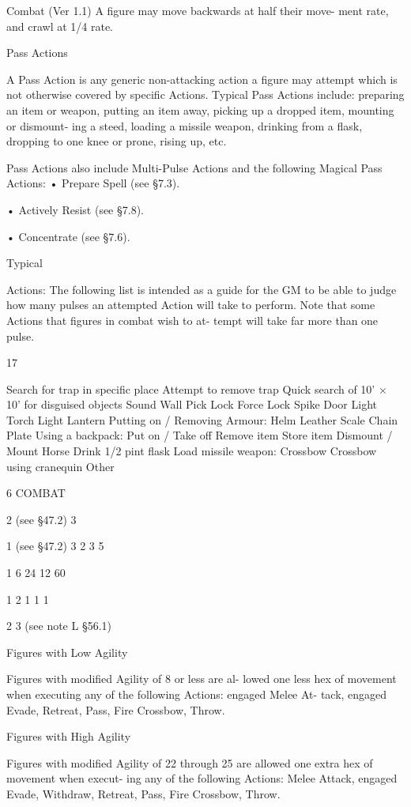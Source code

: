 \begin{Chapter}{Combat (Ver 1.1)}
A  figure may move backwards at half their move-
ment rate, and crawl at 1/4 rate. 

Pass Actions 

A Pass Action is any generic non-attacking action a 
figure may attempt which is not otherwise covered 
by  specific  Actions.  Typical  Pass  Actions  include: 
preparing an item or weapon, putting an item away, 
picking up a dropped item, mounting or dismount-
ing  a  steed,  loading  a  missile  weapon,  drinking 
from a flask, dropping to one knee or prone, rising 
up, etc. 

Pass Actions also include Multi-Pulse Actions and 
the following Magical Pass Actions:  
• Prepare Spell (see §7.3).  

• Actively Resist (see §7.8).  

• Concentrate (see §7.6). 

Typical 

Actions:  The  following  list  is  intended  as  a  guide 
for the GM to be able to judge how many pulses an 
attempted  Action  will  take  to  perform.  Note  that 
some  Actions  that  figures  in  combat  wish  to  at-
tempt will take far more than one pulse. 

17 

Search for trap in specific place 
Attempt to remove trap 
Quick search of 10’ × 10’ for 
disguised objects 
Sound Wall 
Pick Lock 
Force Lock 
Spike Door 
Light Torch 
Light Lantern 
Putting on / Removing Armour: 
Helm 
Leather 
Scale 
Chain 
Plate 
Using a backpack: 
Put on / Take off 
Remove item 
Store item 
Dismount / Mount Horse 
Drink 1/2 pint flask 
Load missile weapon: 
Crossbow 
Crossbow using cranequin 
Other 

6 COMBAT 

2 
(see §47.2) 
3 

1 
(see §47.2) 
3 
2 
3 
5 
 
1  
6  
24  
12  
60 
 
1 
2 
1 
1 
1 
 
2 
3 
(see note L 
§56.1) 

Figures with Low Agility 

Figures  with  modified  Agility  of  8  or  less  are  al-
lowed  one  less  hex  of  movement  when  executing 
any  of  the  following  Actions:  engaged  Melee  At-
tack, engaged Evade, Retreat, Pass, Fire Crossbow, 
Throw. 

Figures with High Agility 

Figures with modified Agility of 22 through 25 are 
allowed  one  extra  hex  of  movement  when  execut-
ing  any  of  the  following  Actions:  Melee  Attack, 
engaged  Evade,  Withdraw,  Retreat,  Pass,  Fire 
Crossbow, Throw. 


\end{Chapter}

